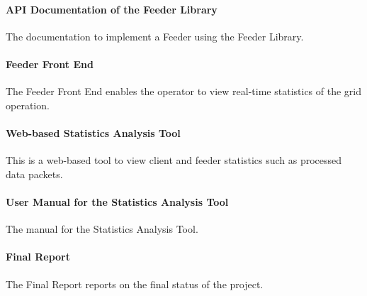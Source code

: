 \paragraph{API Documentation of the Feeder Library} The documentation to implement a Feeder using the Feeder Library.
\paragraph{Feeder Front End} The Feeder Front End enables the operator to view real-time statistics of the grid operation.
\paragraph{Web-based Statistics Analysis Tool} This is a web-based tool to view client and feeder statistics such as processed data packets.
\paragraph{User Manual for the Statistics Analysis Tool} The manual for the Sta\-tis\-tics Analysis Tool.
\paragraph{Final Report} The Final Report reports on the final status of the project.
